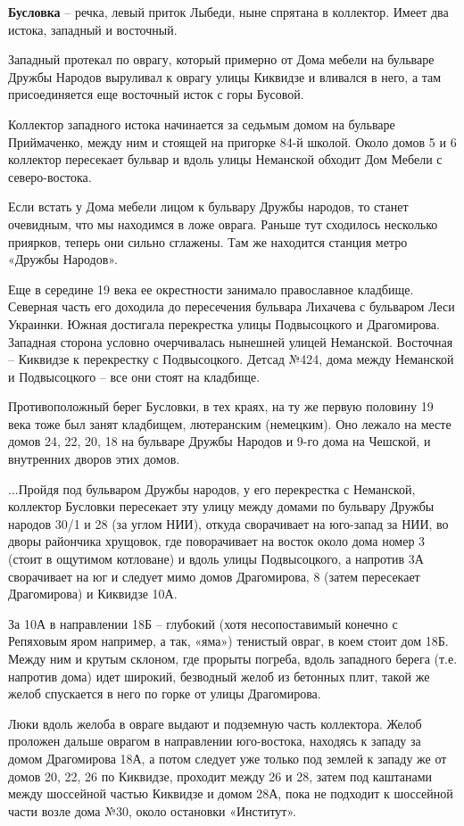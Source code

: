 \textbf{Бусловка} – речка, левый приток Лыбеди, ныне спрятана в коллектор. Имеет два истока, западный и восточный.

Западный протекал по оврагу, который примерно от Дома мебели на бульваре Дружбы Народов выруливал к оврагу улицы Киквидзе и вливался в него, а там присоединяется еще восточный исток с горы Бусовой.

Коллектор западного истока начинается за седьмым домом на бульваре Приймаченко, между ним и стоящей на пригорке 84-й школой. Около домов 5 и 6 коллектор пересекает бульвар и вдоль улицы Неманской обходит Дом Мебели с северо-востока.

Если встать у Дома мебели лицом к бульвару Дружбы народов, то станет очевидным, что мы находимся в ложе оврага. Раньше тут сходилось несколько приярков, теперь они сильно сглажены. Там же находится станция метро «Дружбы Народов». 

Еще в середине 19 века ее окрестности занимало православное кладбище. Северная часть его доходила до пересечения бульвара Лихачева с бульваром Леси Украинки. Южная достигала перекрестка улицы Подвысоцкого и Драгомирова. Западная сторона условно очерчивалась нынешней улицей Неманской. Восточная – Киквидзе к перекрестку с Подвысоцкого. Детсад №424, дома между Неманской и Подвысоцкого – все они стоят на кладбище.

Противоположный берег Бусловки, в тех краях, на ту же первую половину 19 века тоже был занят кладбищем, лютеранским (немецким). Оно лежало на месте домов 24, 22, 20, 18 на бульваре Дружбы Народов и 9-го дома на Чешской, и внутренних дворов этих домов.

...Пройдя под бульваром Дружбы народов, у его перекрестка с Неманской, коллектор Бусловки пересекает эту улицу между домами по бульвару Дружбы народов 30/1 и 28 (за углом НИИ), откуда сворачивает на юго-запад за НИИ, во дворы райончика хрущовок, где поворачивает на восток около дома номер 3 (стоит в ощутимом котловане) и вдоль улицы Подвысоцкого, а напротив 3А сворачивает на юг и следует мимо домов Драгомирова, 8 (затем пересекает Драгомирова) и Киквидзе 10А.

За 10А в направлении 18Б – глубокий (хотя несопоставимый конечно с Репяховым яром например, а так, «яма») тенистый овраг, в коем стоит дом 18Б. Между ним и крутым склоном, где прорыты погреба, вдоль западного берега (т.е. напротив дома) идет широкий, безводный желоб из бетонных плит, такой же желоб спускается в него по горке от улицы Драгомирова.  

Люки вдоль желоба в овраге выдают и подземную часть коллектора. Желоб проложен дальше оврагом в направлении юго-востока, находясь к западу за домом Драгомирова 18А, а потом следует уже только под землей к западу же от домов 20, 22, 26 по Киквидзе, проходит между 26 и 28, затем под каштанами между шоссейной частью Киквидзе и домом 28А, пока не подходит к шоссейной части возле дома №30, около остановки «Институт».


